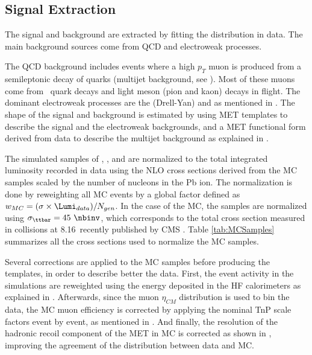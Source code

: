 
\subsection{Signal Extraction}\label{sec:WBoson_Analysis_SignalExtraction}

The signal and background are extracted by fitting the \ETslash distribution in data. The main background sources come from QCD and electroweak processes.

The QCD background includes events where a high $p_{T}$ muon is produced from a semileptonic decay of quarks (multijet background, see ). Most of these muons come from \PQb\ quark decays and light meson (pion and kaon) decays in flight. The dominant electroweak processes are the \DYToMuMu (Drell-Yan) and \WToTauNu as mentioned in . The shape of the signal and background is estimated by using MET templates to describe the signal and the electroweak backgrounds, and a MET functional form derived from data to describe the multijet background as explained in .

The simulated samples of \DYToMuMu , \DYToTauTau , \WToMuNu and \WToTauNu are normalized to the total integrated luminosity recorded in data using the NLO cross sections derived from the \POWHEG MC samples scaled by the number of nucleons in the Pb ion. The normalization is done by reweighting all MC events by a global factor defined as $w_{MC} = (\sigma\times\Lumi_{data})/N_{gen}$. In the case of the \ttbar MC, the samples are normalized using $\sigma_{\ttbar} = 45~\nbinv$, which corresponds to the total cross section measured in \pPb collisions at 8.16~\TeV recently published by CMS \cite{HIN-17-002}. Table \ref{tab:MCSamples} summarizes all the cross sections used to normalize the MC samples.

Several corrections are applied to the MC samples before producing the templates, in order to describe better the data. First, the event activity in the simulations are reweighted using the energy deposited in the HF calorimeters as explained in . Afterwards, since the muon $\eta_{CM}$ distribution is used to bin the data, the MC muon efficiency is corrected by applying the nominal TnP scale factors event by event, as mentioned in . And finally, the resolution of the hadronic recoil component of the MET in MC is corrected as shown in , improving the agreement of the \ETslash distribution between data and MC.

